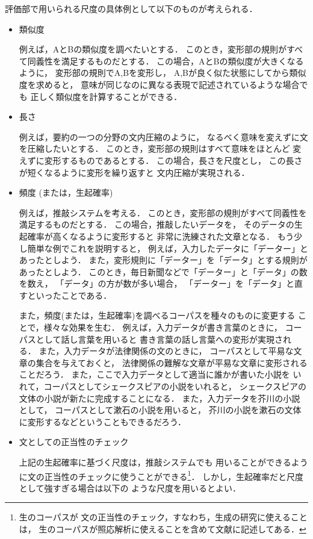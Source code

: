 評価部で用いられる尺度の具体例として以下のものが考えられる．
{\begin{itemize}
\item 
  類似度

  例えば，AとBの類似度を調べたいとする．
  このとき，変形部の規則がすべて同義性を満足するものだとする．
  この場合，AとBの類似度が大きくなるように，
  変形部の規則でA,Bを変形し，
  A,Bが良く似た状態にしてから類似度を求めると，
  意味が同じなのに異なる表現で記述されているような場合でも
  正しく類似度を計算することができる．

\item 
  長さ

  例えば，要約の一つの分野の文内圧縮のように，
  なるべく意味を変えずに文を圧縮したいとする．
  このとき，変形部の規則はすべて意味をほとんど
  変えずに変形するものであるとする．
  この場合，長さを尺度とし，
  この長さが短くなるように変形を繰り返すと
  文内圧縮が実現される．

\item 
  頻度 (または，生起確率)

  例えば，推敲システムを考える．
  このとき，変形部の規則がすべて同義性を満足するものだとする．
  この場合，推敲したいデータを，
  そのデータの生起確率が高くなるように変形すると
  非常に洗練された文章となる．
  もう少し簡単な例でこれを説明すると，
  例えば，入力したデータに「データー」とあったとしよう．
  また，変形規則に「データー」を「データ」とする規則が
  あったとしよう．
  このとき，毎日新聞\cite{mainichi_jap_all}などで「データー」と「データ」の数を数え，
  「データ」の方が数が多い場合，
  「データー」を「データ」と直すといったことである．

  また，頻度(または，生起確率)を調べるコーパスを種々のものに変更する
  ことで，様々な効果を生む．
  例えば，入力データが書き言葉のときに，
  コーパスとして話し言葉を用いると
  書き言葉の話し言葉への変形が実現される\cite{murata_kaiho_2001}．
  また，入力データが法律関係の文のときに，
  コーパスとして平易な文章の集合を与えておくと，
  法律関係の難解な文章が平易な文章に変形されることだろう．
  また，ここで入力データとして適当に誰かが書いた小説を
  いれて，コーパスとしてシェークスピアの小説をいれると，
  シェークスピアの文体の小説が新たに完成することになる．
  また，入力データを芥川の小説として，
  コーパスとして漱石の小説を用いると，
  芥川の小説を漱石の文体に変形するなどということもできるだろう．

\item 
  文としての正当性のチェック

  上記の生起確率に基づく尺度は，推敲システムでも
  用いることができるように文の正当性のチェックに使うことができる\footnote{生のコーパスが
    文の正当性のチェック，すなわち，生成の研究に使えることは，
    生のコーパスが照応解析に使えることを含めて文献\cite{murata_anaphora_all_NLC}に記述してある．}．
  しかし，生起確率だと尺度として強すぎる場合は以下の
  ような尺度を用いるとよい．
  

\end{itemize}}
